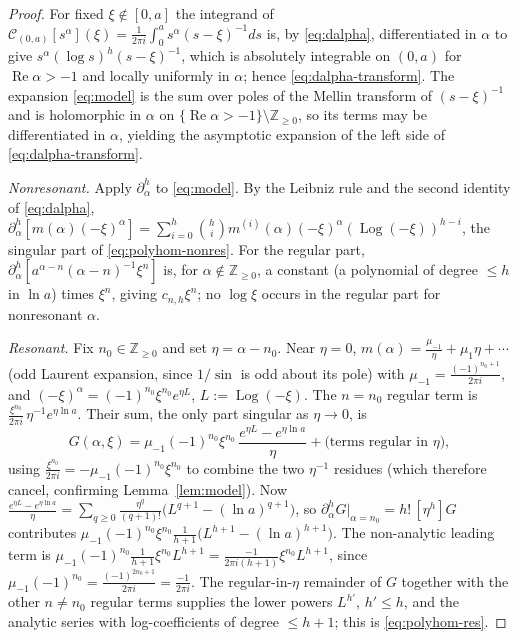 \documentclass[10pt,a4paper]{amsart}
\newcommand{\Cau}{\mathcal{C}}
\newcommand{\Log}{\operatorname{Log}}
\newcommand{\Real}{\operatorname{Re}}
\newcommand{\Z}{\mathbb{Z}}
\begin{document}
\begin{proof}
For fixed $\xi\notin[0,a]$ the integrand of
$\Cau_{(0,a)}[s^{\alpha}](\xi)=\frac{1}{2\pi i}\int_0^a s^{\alpha}(s-\xi)^{-1}ds$
is, by \eqref{eq:dalpha}, differentiated in $\alpha$ to give
$s^{\alpha}(\log s)^{h}(s-\xi)^{-1}$, which is absolutely integrable on $(0,a)$
for $\Real\alpha>-1$ and locally uniformly in $\alpha$; hence
\eqref{eq:dalpha-transform}. The expansion \eqref{eq:model} is the sum over poles
of the Mellin transform of $(s-\xi)^{-1}$ and is holomorphic in $\alpha$ on
$\{\Real\alpha>-1\}\setminus\Z_{\ge0}$, so its terms may be differentiated in
$\alpha$, yielding the asymptotic expansion of the left side of
\eqref{eq:dalpha-transform}.

\emph{Nonresonant.} Apply $\partial_\alpha^{h}$ to \eqref{eq:model}. By the
Leibniz rule and the second identity of \eqref{eq:dalpha},
$\partial_\alpha^{h}[m(\alpha)(-\xi)^{\alpha}]
=\sum_{i=0}^{h}\binom{h}{i}m^{(i)}(\alpha)(-\xi)^{\alpha}(\Log(-\xi))^{h-i}$,
the singular part of \eqref{eq:polyhom-nonres}. 
For the regular part,
$\partial_\alpha^{h}[a^{\alpha-n}(\alpha-n)^{-1}\xi^{n}]$ is, for
$\alpha\notin\Z_{\ge0}$, a constant (a polynomial of degree $\le h$ in $\ln a$)
times $\xi^{n}$, giving $c_{n,h}\xi^{n}$; no $\log\xi$ occurs in the regular
part for nonresonant $\alpha$.

\emph{Resonant.} Fix $n_0\in\Z_{\ge0}$ and set $\eta=\alpha-n_0$. Near $\eta=0$,
$m(\alpha)=\frac{\mu_{-1}}{\eta}+\mu_1\eta+\cdots$ (odd Laurent expansion, since
$1/\sin$ is odd about its pole) with $\mu_{-1}=\frac{(-1)^{n_0+1}}{2\pi i}$, and
$(-\xi)^{\alpha}=(-1)^{n_0}\xi^{n_0}e^{\eta L}$, $L:=\Log(-\xi)$. The $n=n_0$
regular term is $\frac{\xi^{n_0}}{2\pi i}\,\eta^{-1}e^{\eta\ln a}$. Their sum,
the only part singular as $\eta\to0$, is
\[
  G(\alpha,\xi)
  =\mu_{-1}(-1)^{n_0}\xi^{n_0}\,\frac{e^{\eta L}-e^{\eta\ln a}}{\eta}
   +\bigl(\text{terms regular in }\eta\bigr),
\]
using $\frac{\xi^{n_0}}{2\pi i}=-\mu_{-1}(-1)^{n_0}\xi^{n_0}$ to combine the two
$\eta^{-1}$ residues (which therefore cancel, confirming
Lemma~\ref{lem:model}). 
Now
$\frac{e^{\eta L}-e^{\eta\ln a}}{\eta}=\sum_{q\ge0}\frac{\eta^{q}}{(q+1)!}
\bigl(L^{q+1}-(\ln a)^{q+1}\bigr)$, so
$\partial_\alpha^{h}G|_{\alpha=n_0}=h!\,[\eta^{h}]G$ contributes
$\mu_{-1}(-1)^{n_0}\xi^{n_0}\frac{1}{h+1}\bigl(L^{h+1}-(\ln a)^{h+1}\bigr)$. The
non-analytic leading term is
$\mu_{-1}(-1)^{n_0}\frac{1}{h+1}\xi^{n_0}L^{h+1}
=\frac{-1}{2\pi i(h+1)}\xi^{n_0}L^{h+1}$, since
$\mu_{-1}(-1)^{n_0}=\frac{(-1)^{2n_0+1}}{2\pi i}=\frac{-1}{2\pi i}$. The
regular-in-$\eta$ remainder of $G$ together with the other $n\neq n_0$ regular
terms supplies the lower powers $L^{h'}$, $h'\le h$, and the analytic series with
log-coefficients of degree $\le h+1$; this is \eqref{eq:polyhom-res}.
\end{proof}
\end{document}
